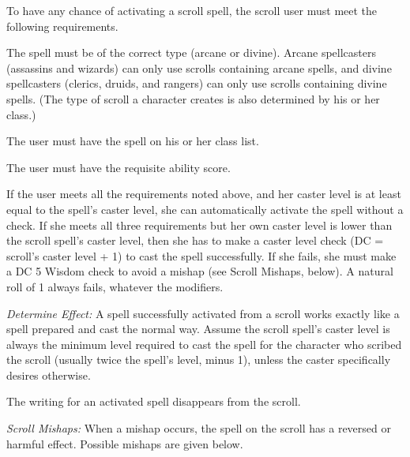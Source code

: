 To have any chance of activating a scroll spell, the scroll user must meet the following requirements.

\begin{itemize*}
\item The spell must be of the correct type (arcane or divine). Arcane spellcasters (assassins and wizards) can only use scrolls containing arcane spells, and divine spellcasters (clerics, druids, and rangers) can only use scrolls containing divine spells. (The type of scroll a character creates is also determined by his or her class.)
\item The user must have the spell on his or her class list.
\item The user must have the requisite ability score.
\end{itemize*}

If the user meets all the requirements noted above, and her caster level is at least equal to the spell's caster level, she can automatically activate the spell without a check. If she meets all three requirements but her own caster level is lower than the scroll spell's caster level, then she has to make a caster level check (DC = scroll's caster level + 1) to cast the spell successfully. If she fails, she must make a DC 5 Wisdom check to avoid a mishap (see Scroll Mishaps, below). A natural roll of 1 always fails, whatever the modifiers.

\textit{Determine Effect:} A spell successfully activated from a scroll works exactly like a spell prepared and cast the normal way. Assume the scroll spell's caster level is always the minimum level required to cast the spell for the character who scribed the scroll (usually twice the spell's level, minus 1), unless the caster specifically desires otherwise.

The writing for an activated spell disappears from the scroll.

\textit{Scroll Mishaps:} When a mishap occurs, the spell on the scroll has a reversed or harmful effect. Possible mishaps are given below.


